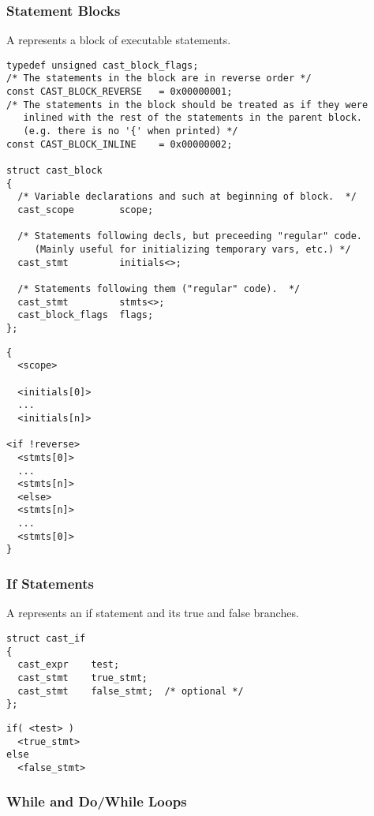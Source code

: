 \subsubsection{Statement Blocks}

A  represents a block of executable statements.

\begin{verbatim}
typedef unsigned cast_block_flags;
/* The statements in the block are in reverse order */
const CAST_BLOCK_REVERSE   = 0x00000001;
/* The statements in the block should be treated as if they were
   inlined with the rest of the statements in the parent block.
   (e.g. there is no '{' when printed) */
const CAST_BLOCK_INLINE    = 0x00000002;

struct cast_block
{
  /* Variable declarations and such at beginning of block.  */
  cast_scope        scope;

  /* Statements following decls, but preceeding "regular" code.
     (Mainly useful for initializing temporary vars, etc.) */
  cast_stmt         initials<>;
  
  /* Statements following them ("regular" code).  */
  cast_stmt         stmts<>;
  cast_block_flags  flags;
};
\end{verbatim}

\begin{verbatim}
{
  <scope>

  <initials[0]>
  ...
  <initials[n]>

<if !reverse>
  <stmts[0]>
  ...
  <stmts[n]>
  <else>
  <stmts[n]>
  ...
  <stmts[0]>
}
\end{verbatim}

\subsubsection{If Statements}

A  represents an if statement and its true and false branches.

\begin{verbatim}
struct cast_if
{
  cast_expr    test;
  cast_stmt    true_stmt;
  cast_stmt    false_stmt;  /* optional */
};
\end{verbatim}

\begin{verbatim}
if( <test> )
  <true_stmt>
else
  <false_stmt>
\end{verbatim}

\subsubsection{While and Do/While Loops}

